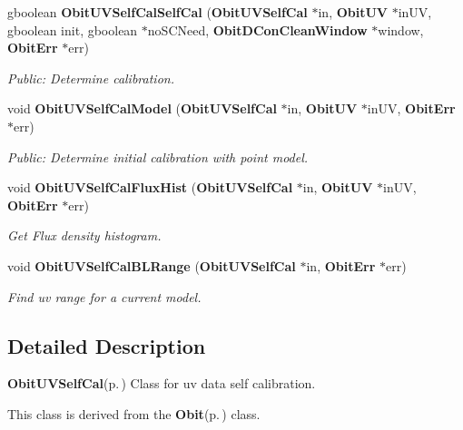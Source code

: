\begin{CompactItemize}
gboolean {\bf Obit\-UVSelf\-Cal\-Self\-Cal} ({\bf Obit\-UVSelf\-Cal} $\ast$in, {\bf Obit\-UV} $\ast$in\-UV, gboolean init, gboolean $\ast$no\-SCNeed, {\bf Obit\-DCon\-Clean\-Window} $\ast$window, {\bf Obit\-Err} $\ast$err)
\begin{CompactList}\small\item\em Public: Determine calibration. \item\end{CompactList}\item 
void {\bf Obit\-UVSelf\-Cal\-Model} ({\bf Obit\-UVSelf\-Cal} $\ast$in, {\bf Obit\-UV} $\ast$in\-UV, {\bf Obit\-Err} $\ast$err)
\begin{CompactList}\small\item\em Public: Determine initial calibration with point model. \item\end{CompactList}\item 
void {\bf Obit\-UVSelf\-Cal\-Flux\-Hist} ({\bf Obit\-UVSelf\-Cal} $\ast$in, {\bf Obit\-UV} $\ast$in\-UV, {\bf Obit\-Err} $\ast$err)
\begin{CompactList}\small\item\em Get Flux density histogram. \item\end{CompactList}\item 
void {\bf Obit\-UVSelf\-Cal\-BLRange} ({\bf Obit\-UVSelf\-Cal} $\ast$in, {\bf Obit\-Err} $\ast$err)
\begin{CompactList}\small\item\em Find uv range for a current model. \item\end{CompactList}\end{CompactItemize}


\subsection{Detailed Description}
{\bf Obit\-UVSelf\-Cal}{\rm (p.\,\pageref{structObitUVSelfCal})} Class for uv data self calibration. 

This class is derived from the {\bf Obit}{\rm (p.\,\pageref{structObit})} class.

